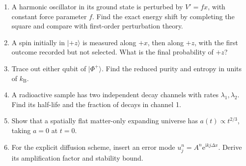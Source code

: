\documentclass[11pt,oneside]{book}
\newcommand{\ii}{\mathrm{i}}
\newcommand{\ee}{\mathrm{e}}
\newcommand{\ket}[1]{\lvert #1\rangle}
\newcommand{\kb}{k_{\mathrm B}}
\theoremstyle{reviewstyle}
\begin{document}
\begin{enumerate}
\item A harmonic oscillator in its ground state is perturbed by $V'=fx$, with constant force parameter $f$. Find the exact energy shift by completing the square and compare with first-order perturbation theory.
\item A spin initially in $\ket{+z}$ is measured along $+x$, then along $+z$, with the first outcome recorded but not selected. What is the final probability of $+z$?
\item Trace out either qubit of $\ket{\Phi^+}$. Find the reduced purity and entropy in units of $\kb$.
\item A radioactive sample has two independent decay channels with rates $\lambda_1,\lambda_2$. Find its half-life and the fraction of decays in channel 1.
\item Show that a spatially flat matter-only expanding universe has $a(t)\propto t^{2/3}$, taking $a=0$ at $t=0$.
\item For the explicit diffusion scheme, insert an error mode $u_j^n=A^n\ee^{\ii kj\Delta x}$. Derive its amplification factor and stability bound.
\end{enumerate}
\end{document}

